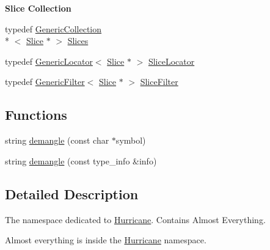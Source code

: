 \begin{Indent}{\bf Slice Collection}\par
\begin{DoxyCompactItemize}
\item 
typedef \hyperlink{classHurricane_1_1GenericCollection}{Generic\-Collection}\\*
$<$ \hyperlink{classHurricane_1_1Slice}{Slice} $\ast$ $>$ \hyperlink{namespaceHurricane_aa4a7e8a563c5687621eb5e57ade1706a}{Slices}
\item 
typedef \hyperlink{classHurricane_1_1GenericLocator}{Generic\-Locator}$<$ \hyperlink{classHurricane_1_1Slice}{Slice} $\ast$ $>$ \hyperlink{namespaceHurricane_a5c3b720aae3437342e9d6c57729dc895}{Slice\-Locator}
\item 
typedef \hyperlink{classHurricane_1_1GenericFilter}{Generic\-Filter}$<$ \hyperlink{classHurricane_1_1Slice}{Slice} $\ast$ $>$ \hyperlink{namespaceHurricane_a80703f9d02b235f3291fabbf53f86d4e}{Slice\-Filter}
\end{DoxyCompactItemize}
\end{Indent}
\subsection*{Functions}
\begin{DoxyCompactItemize}
\item 
string \hyperlink{group__Generalities_ga93af87d1b7b19294382ba6dae51d0363}{demangle} (const char $\ast$symbol)
\item 
string \hyperlink{group__Generalities_gae4be209e8a3f2227b0c7a22246817c6f}{demangle} (const type\-\_\-info \&info)
\end{DoxyCompactItemize}


\subsection{Detailed Description}
The namespace dedicated to \hyperlink{namespaceHurricane}{Hurricane}. Contains Almost Everything.

Almost everything is inside the \hyperlink{namespaceHurricane}{Hurricane} namespace. 


